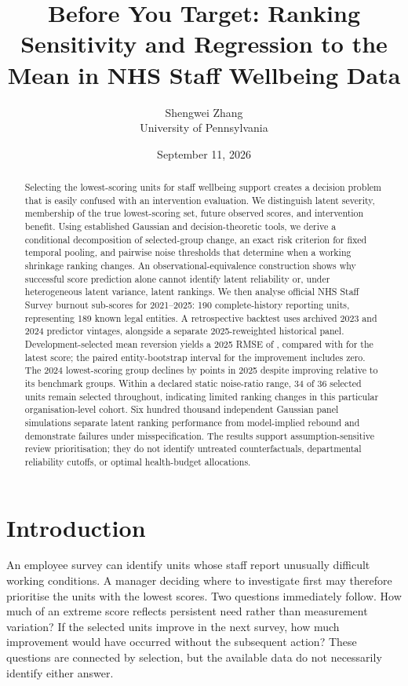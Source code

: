 \documentclass[11pt,letterpaper]{article}
\title{Before You Target: Ranking Sensitivity and Regression to the Mean in NHS Staff Wellbeing Data}
\author{Shengwei Zhang\\University of Pennsylvania}
\date{September 11, 2026}
\begin{document}
\maketitle
\begin{abstract}
Selecting the lowest-scoring units for staff wellbeing support creates a decision problem that is easily confused with an intervention evaluation. We distinguish latent severity, membership of the true lowest-scoring set, future observed scores, and intervention benefit. Using established Gaussian and decision-theoretic tools, we derive a conditional decomposition of selected-group change, an exact risk criterion for fixed temporal pooling, and pairwise noise thresholds that determine when a working shrinkage ranking changes. An observational-equivalence construction shows why successful score prediction alone cannot identify latent reliability or, under heterogeneous latent variance, latent rankings. We then analyse official NHS Staff Survey burnout sub-scores for 2021--2025: 190 complete-history reporting units, representing 189 known legal entities. A retrospective backtest uses archived 2023 and 2024 predictor vintages, alongside a separate 2025-reweighted historical panel. Development-selected mean reversion yields a 2025 RMSE of \MeanVrmse{}, compared with \RawVrmse{} for the latest score; the paired entity-bootstrap interval for the improvement includes zero. The 2024 lowest-scoring group declines by \SelectedDecline{} points in 2025 despite improving relative to its benchmark groups. Within a declared static noise-ratio range, 34 of 36 selected units remain selected throughout, indicating limited ranking changes in this particular organisation-level cohort. Six hundred thousand independent Gaussian panel simulations separate latent ranking performance from model-implied rebound and demonstrate failures under misspecification. The results support assumption-sensitive review prioritisation; they do not identify untreated counterfactuals, departmental reliability cutoffs, or optimal health-budget allocations.
\end{abstract}

\section{Introduction}
An employee survey can identify units whose staff report unusually difficult working conditions. A manager deciding where to investigate first may therefore prioritise the units with the lowest scores. Two questions immediately follow. How much of an extreme score reflects persistent need rather than measurement variation? If the selected units improve in the next survey, how much improvement would have occurred without the subsequent action? These questions are connected by selection, but the available data do not necessarily identify either answer.
\end{document}
